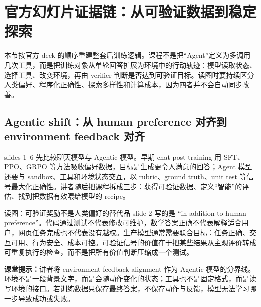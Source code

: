 \section{官方幻灯片证据链：从可验证数据到稳定探索}

本节按官方 deck 的顺序重建整套后训练逻辑。课程不是把“Agent”定义为多调用几次工具，而是把训练对象从单轮回答扩展为环境中的行动轨迹：模型读取状态、选择工具、改变环境，再由 verifier 判断是否达到可验证目标。读图时要持续区分人类偏好、程序化正确性、探索多样性和计算成本，因为四者并不会自动同步改善。

\subsection{Agentic shift：从 human preference 对齐到 environment feedback 对齐}

slides 1--6 先比较聊天模型与 Agentic 模型。早期 chat post-training 用 SFT、PPO、GRPO 等方法吸收偏好数据，目标是生成更令人满意的回答；Agent 模型还要与 sandbox、工具和环境状态交互，以 rubric、ground truth、unit test 等信号最大化正确性。讲者随后把课程拆成三步：获得可验证数据、定义“智能”的评估、找到把数据有效喂给模型的 recipe。


\begin{knowledgebox}{读图：可验证奖励不是人类偏好的替代品}
slide 2 写的是 ``in addition to human preference''。代码通过测试不代表修改可维护，数学答案正确不代表解释适合用户，网页任务完成也不代表没有越权。生产模型通常需要联合目标：任务正确、交互可用、行为安全、成本可控。可验证信号的价值在于把某些结果从主观评价转成可重复执行的检查，而不是把所有价值判断压缩成一个测试。
\end{knowledgebox}

\textbf{课堂提示：}讲者将 environment feedback alignment 作为 Agentic 模型的分界线。环境不是一段背景文字，而是会随动作变化的状态；工具也不是固定格式，而是读写环境的接口。若训练数据只保存最终答案，不保存动作与反馈，模型无法学习哪一步导致成功或失败。


